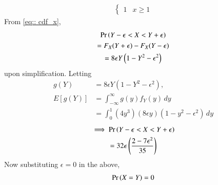 \begin{enumerate}
\begin{align}
\begin{cases}
1 &    x \ge 1
\end{cases}
\end{align}
From \eqref{eq:: cdf_x},
\begin{multline}
    \Pr\left(Y- \epsilon < X < Y + \epsilon\right) 
    \\
    = F_X(Y + \epsilon) -  F_X(Y - \epsilon)  
    \\
     = 8\epsilon Y\left(1 - Y^2 - \epsilon^2\right)
\end{multline}
upon simplification.  Letting
%
\begin{align}
g(Y)&= 8\epsilon Y(1 - Y^2 - \epsilon^2), \\
    E[g(Y)] &= \int_{-\infty}^{\infty} g(y) f_Y(y) \,dy 
    \\
     & = \int_{0}^{1} (4y^3) (8\epsilon y)(1 - y^2 - \epsilon^2) \,dy 
\end{align}
\begin{multline}
\implies     \Pr\left(Y- \epsilon < X < Y + \epsilon\right)     \\
= 32\epsilon \left(\frac{2- 7\epsilon^2}{35}\right)
\end{multline}
Now substituting $ \epsilon = 0 $ in the above, 
\begin{align}
    \Pr\left(X =Y\right)  = 0
\end{align}
\end{enumerate}